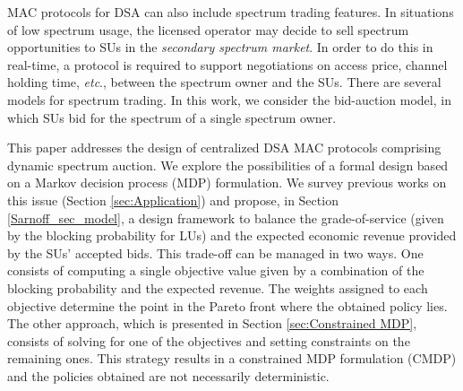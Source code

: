 MAC protocols for DSA can also include spectrum trading features. In situations of low spectrum usage, the licensed operator may decide to sell spectrum opportunities to SUs in the \textit{secondary spectrum market}. In order to do this in real-time, a protocol is required to support negotiations on access price, channel holding time, \textit{etc}., between the spectrum owner and the SUs. There are several models for spectrum trading. In this work, we consider the bid-auction model, in which SUs bid for the spectrum of a single spectrum owner.

This paper addresses the design of centralized DSA MAC protocols comprising dynamic spectrum auction. We explore the possibilities of a formal design based on a Markov decision process (MDP) formulation. We survey previous works on this issue (Section \ref{sec:Application}) and propose, in Section \ref{Sarnoff_sec_model}, a design framework to balance the grade-of-service (given by the blocking probability for LUs) and the expected economic revenue provided by the SUs' accepted bids. This trade-off can be managed in two ways. One consists of computing a single objective value given by a combination of the blocking probability and the expected revenue. The weights assigned to each objective determine the point in the Pareto front where the obtained policy lies. The other approach, which is presented in Section \ref{sec:Constrained MDP}, consists of solving for one of the objectives and setting constraints on the remaining ones.
This strategy results in a constrained MDP formulation (CMDP) and the policies obtained are not necessarily deterministic.



